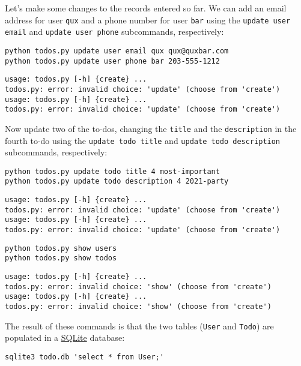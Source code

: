 \documentclass[10pt]{amsart}
\numberwithin{equation}{section}
\begin{document}
Let's make some changes to the records entered so far. We can add an email address
for user \texttt{qux} and a phone number for user \texttt{bar} using the \texttt{update user email} 
and \texttt{update user phone} subcommands, respectively:
\begin{verbatim}
python todos.py update user email qux qux@quxbar.com
python todos.py update user phone bar 203-555-1212
\end{verbatim}

\begin{verbatim}
usage: todos.py [-h] {create} ...
todos.py: error: invalid choice: 'update' (choose from 'create')
usage: todos.py [-h] {create} ...
todos.py: error: invalid choice: 'update' (choose from 'create')
\end{verbatim}


Now update two of the to-dos, changing the \texttt{title} and the \texttt{description} in the fourth
to-do using the \texttt{update todo title} and \texttt{update todo description} subcommands, respectively:
\begin{verbatim}
python todos.py update todo title 4 most-important
python todos.py update todo description 4 2021-party
\end{verbatim}

\begin{verbatim}
usage: todos.py [-h] {create} ...
todos.py: error: invalid choice: 'update' (choose from 'create')
usage: todos.py [-h] {create} ...
todos.py: error: invalid choice: 'update' (choose from 'create')
\end{verbatim}


\begin{verbatim}
python todos.py show users
python todos.py show todos
\end{verbatim}

\begin{verbatim}
usage: todos.py [-h] {create} ...
todos.py: error: invalid choice: 'show' (choose from 'create')
usage: todos.py [-h] {create} ...
todos.py: error: invalid choice: 'show' (choose from 'create')
\end{verbatim}


The result of these commands is that the two tables (\texttt{User} and \texttt{Todo})
are populated in a \href{https://www.sqlite.org/index.html}{SQLite} database:
\begin{verbatim}
sqlite3 todo.db 'select * from User;'
\end{verbatim}
\end{document}
